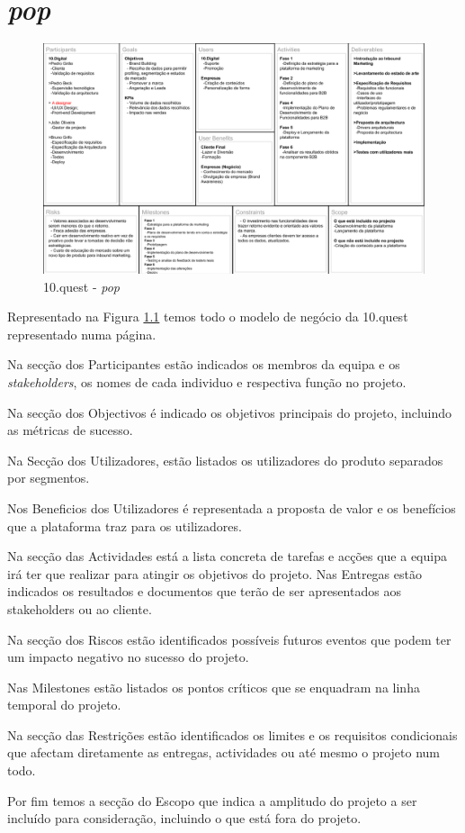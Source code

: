 \chapter{\textit{\gls{pop}}}
\label{a:bvm}

\begin{figure}[ht!]
	\begin{center}
		\includegraphics[width=1\textwidth]{img/bmc}
		\caption{10.quest - \textit{\gls{pop}}}
		\label{10q-bmc}
	\end{center}
\end{figure}

Representado na Figura \ref{10q-bmc} temos todo o modelo de negócio da 10.quest representado numa página.

Na secção dos Participantes estão indicados os membros da equipa e os \textit{stakeholders}, os nomes de cada individuo e respectiva função no projeto. 
 
Na secção dos Objectivos é indicado os objetivos principais do projeto, incluindo as métricas de sucesso. 
 
Na Secção dos Utilizadores, estão listados os utilizadores do produto separados por segmentos. 
 
Nos Beneficios dos Utilizadores é representada a proposta de valor e os benefícios que a plataforma traz para os utilizadores. 
 
Na secção das Actividades está a lista concreta de tarefas e acções que a equipa irá ter que realizar para atingir os objetivos do projeto. Nas Entregas estão indicados os resultados e documentos que terão de ser apresentados aos stakeholders ou ao cliente. 
 
Na secção dos Riscos estão identificados possíveis futuros eventos que podem ter um impacto negativo no sucesso do projeto. 
 
Nas Milestones estão listados os pontos críticos que se enquadram na linha temporal do projeto. 

Na secção das Restrições estão identificados os limites e os requisitos condicionais que afectam diretamente as entregas, actividades ou até mesmo o projeto num todo. 

Por fim temos a secção do Escopo que indica a amplitudo do projeto a ser incluído para consideração, incluindo o que está fora do projeto.